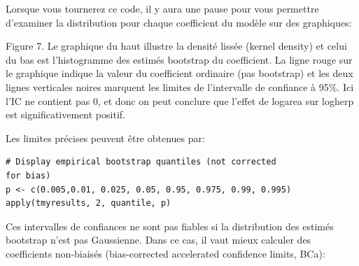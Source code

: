 \documentclass[12pt,]{book}
\newenvironment{Shaded}{\begin{snugshade}}{\end{snugshade}}
\newcommand{\DataTypeTok}[1]{\textcolor[rgb]{0.27,0.27,0.27}{#1}}
\newcommand{\DecValTok}[1]{\textcolor[rgb]{0.06,0.06,0.06}{#1}}
\newcommand{\FloatTok}[1]{\textcolor[rgb]{0.06,0.06,0.06}{#1}}
\newcommand{\KeywordTok}[1]{\textcolor[rgb]{0.27,0.27,0.27}{\textbf{#1}}}
\newcommand{\NormalTok}[1]{#1}
\newcommand{\OperatorTok}[1]{\textcolor[rgb]{0.43,0.43,0.43}{\textbf{#1}}}
\newcommand{\OtherTok}[1]{\textcolor[rgb]{0.37,0.37,0.37}{#1}}
\newcommand{\StringTok}[1]{\textcolor[rgb]{0.5,0.5,0.5}{#1}}
\begin{document}
\begin{Shaded}
\end{Shaded}

Lorsque vous tournerez ce code, il y aura une pause pour vous permettre d'examiner la distribution pour chaque coefficient du modèle sur des graphiques:

Figure 7.
Le graphique du haut illustre la densité lissée (kernel density) et celui du bas est l'histogramme des estimés bootstrap du coefficient. La ligne rouge sur le graphique indique la valeur du coefficient ordinaire (pas bootstrap) et les deux lignes verticales noires marquent les limites de l'intervalle de confiance à 95\%. Ici l'IC ne contient pas 0, et donc on peut conclure que l'effet de logarea sur logherp est significativement positif.

Les limites précises peuvent être obtenues par:

\begin{verbatim}
# Display empirical bootstrap quantiles (not corrected
for bias)
p <- c(0.005,0.01, 0.025, 0.05, 0.95, 0.975, 0.99, 0.995)
apply(tmyresults, 2, quantile, p)
\end{verbatim}

Ces intervalles de confiances ne sont pas fiables si la distribution des estimés bootstrap n'est pas Gaussienne. Dans ce cas, il vaut mieux calculer des coefficients non-biaisés (bias-corrected accelerated confidence limits, BCa):
\end{document}
